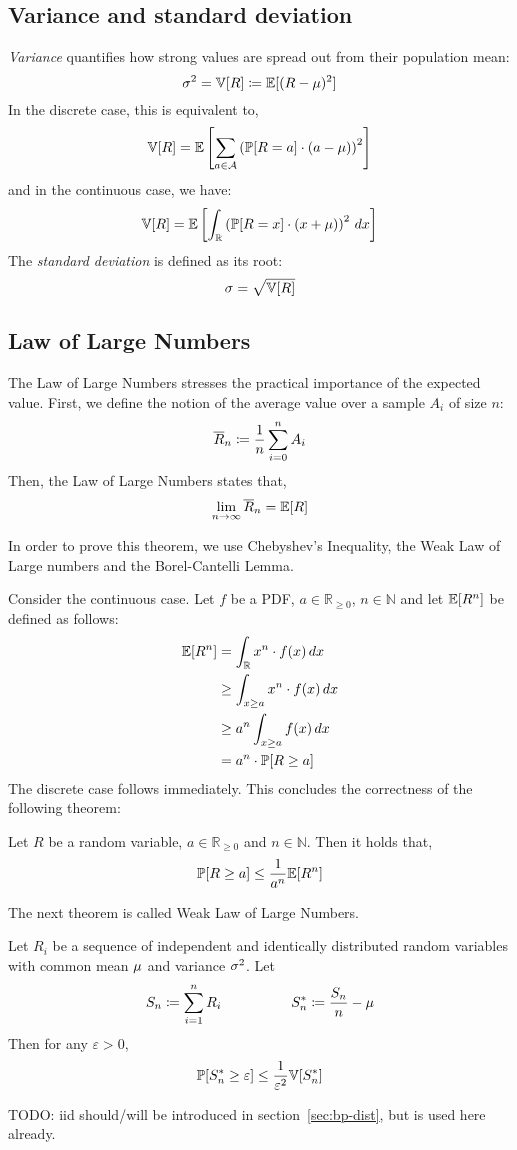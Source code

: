 \subsection{Variance and standard deviation}
\label{sec:bp-var-sd}
%
\emph{Variance} quantifies how strong values are spread out from their population mean:
\[ \sigma^2 = \mathbb V[R] \coloneqq \mathbb E[(R - \mu)^2] \]
In the discrete case, this is equivalent to,
\[ \mathbb V[R] = \mathbb E\left[\sum_{a \in \mathcal A} \left(\mathbb P[R=a] \cdot (a - \mu)\right)^2\right] \]
and in the continuous case, we have:
\[ \mathbb V[R] = \mathbb E\left[\int_{\mathbb R} \left(\mathbb P[R=x] \cdot (x + \mu)\right)^2 \, dx\right] \]
The \emph{standard deviation} is defined as its root:
\[ \sigma = \sqrt{\mathbb V[R]} \]

\subsection{Law of Large Numbers}
\label{sec:bp-lln}
%
The Law of Large Numbers stresses the practical importance of the expected value.
First, we define the notion of the average value over a sample $A_i$ of size $n$:
\[ \overline{R}_n \coloneqq \frac1n \sum_{i=0}^n A_i \]
Then, the Law of Large Numbers states that,
\[ \lim_{n\to\infty} \overline{R}_n = \mathbb E[R] \]

In order to prove this theorem, we use Chebyshev's Inequality, the Weak Law of Large numbers
and the Borel-Cantelli Lemma.

Consider the continuous case. Let $f$ be a PDF, $a \in \mathbb R_{\geq 0}$, $n \in \mathbb N$ and let $\mathbb E[R^n]$ be defined as follows:
\begin{align*}
  \mathbb E[R^n] &= \int_{\mathbb R} x^n \cdot f(x) \, dx \\
          &\geq \int_{x \geq a} x^n \cdot f(x) \, dx \\
          &\geq a^n \int_{x \geq a} f(x) \, dx \\
          &= a^n \cdot \mathbb P[R \geq a]
\end{align*}
The discrete case follows immediately.
This concludes the correctness of the following theorem:
\begin{theorem}
  Let $R$ be a random variable, $a \in \mathbb R_{\geq 0}$ and $n \in \mathbb N$. Then it holds that,
  \[ \mathbb P[R \geq a] \leq \frac{1}{a^n} \mathbb E[R^n] \]
\end{theorem}

The next theorem is called Weak Law of Large Numbers.
\begin{theorem}
  Let $R_i$ be a sequence of independent and identically distributed random variables
  with common mean $\mu$ and variance $\sigma^2$. Let
  \[
      S_n \coloneqq \sum_{i=1}^n R_i \hspace{50pt}
      S_n^* \coloneqq \frac{S_n}{n} - \mu
  \]
  Then for any $\varepsilon > 0$,
  \[ \mathbb P[S_n^* \geq \varepsilon] \leq \frac{1}{\varepsilon^2} \mathbb V[S^*_n] \]

  TODO: iid should/will be introduced in section~\ref{sec:bp-dist}, but is used here already.
\end{theorem}

